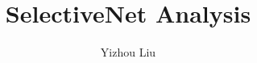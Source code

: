\documentclass[
  letterpaper,
  DIV=11,
  numbers=noendperiod]{scrartcl}
\title{SelectiveNet Analysis}
\author{Yizhou Liu}
\date{}
\begin{document}
\maketitle

\section{}\label{section}
\end{document}
